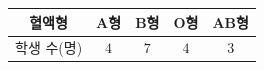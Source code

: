 {\renewcommand{\arraystretch}{1.35}\small
\begin{tabular}{|c|c|c|c|c|}
\hline
혈액형 & A형 & B형 & O형 & AB형 \\ \hline
학생 수(명) & $4$ & $7$ & $4$ & $3$ \\ \hline
\end{tabular}}
